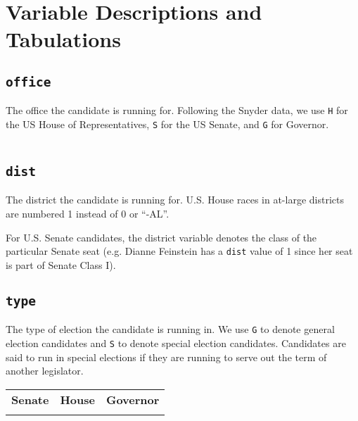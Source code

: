 \documentclass[12pt]{article}
\begin{document}
\section{Variable Descriptions and Tabulations}



\subsection*{\texttt{office}}

The office the candidate is running for. Following the Snyder data, we use \texttt{H} for the US House of Representatives, \texttt{S} for the US Senate, and \texttt{G} for Governor. 


    \begin{tabularx}{\linewidth}{C}
    
    \end{tabularx}

\subsection*{\texttt{dist}}

The district the candidate is running for. U.S. House races in at-large districts are numbered 1 instead of 0 or ``-AL''. 

 For U.S. Senate candidates, the district variable denotes the class of the particular Senate seat (e.g. Dianne Feinstein has a \texttt{dist} value of 1 since her seat is part of Senate Class I). 

\begin{table}[!h]
\centering
\footnotesize

\end{table}





\subsection*{\texttt{type}}

The type of election the candidate is running in. We use \texttt{G} to denote general election candidates and \texttt{S} to denote special election candidates. Candidates are said to run in special elections if they are running to serve out the term of another legislator. 
\begin{table}[!h]
\begin{tabularx}{\linewidth}{CCC}
    \textbf{Senate} & \textbf{House} & \textbf{Governor}\\
     &  & 
\end{tabularx}
\end{table}
\end{document}

